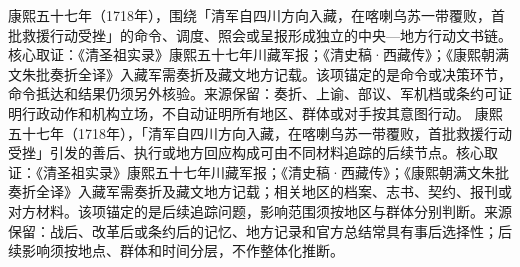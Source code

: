 康熙五十七年（1718年），围绕「清军自四川方向入藏，在喀喇乌苏一带覆败，首批救援行动受挫」的命令、调度、照会或呈报形成独立的中央—地方行动文书链。核心取证：《清圣祖实录》康熙五十七年川藏军报；《清史稿·西藏传》；《康熙朝满文朱批奏折全译》入藏军需奏折及藏文地方记载。该项锚定的是命令或决策环节，命令抵达和结果仍须另外核验。来源保留：奏折、上谕、部议、军机档或条约可证明行政动作和机构立场，不自动证明所有地区、群体或对手按其意图行动。
康熙五十七年（1718年），「清军自四川方向入藏，在喀喇乌苏一带覆败，首批救援行动受挫」引发的善后、执行或地方回应构成可由不同材料追踪的后续节点。核心取证：《清圣祖实录》康熙五十七年川藏军报；《清史稿·西藏传》；《康熙朝满文朱批奏折全译》入藏军需奏折及藏文地方记载；相关地区的档案、志书、契约、报刊或对方材料。该项锚定的是后续追踪问题，影响范围须按地区与群体分别判断。来源保留：战后、改革后或条约后的记忆、地方记录和官方总结常具有事后选择性；后续影响须按地点、群体和时间分层，不作整体化推断。

